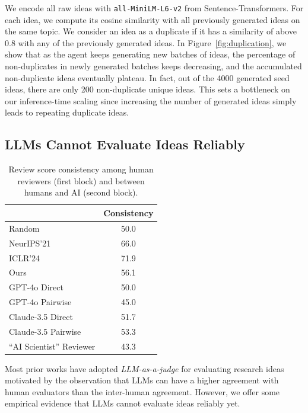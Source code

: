 We encode all raw ideas with \texttt{all-MiniLM-L6-v2} from Sentence-Transformers. For each idea, we compute its cosine similarity with all previously generated ideas on the same topic. 
We consider an idea as a duplicate if it has a similarity of above 0.8 with any of the previously generated ideas. 
In Figure~\ref{fig:duplication}, we show that as the agent keeps generating new batches of ideas, the percentage of non-duplicates in newly generated batches keeps decreasing, and the accumulated non-duplicate ideas eventually plateau. In fact, out of the 4000 generated seed ideas, there are only 200 non-duplicate unique ideas. 
This sets a bottleneck on our inference-time scaling since increasing the number of generated ideas simply leads to repeating duplicate ideas. 


\subsection{LLMs Cannot Evaluate Ideas Reliably}
\label{sec:self_eval}


\begin{table}
\centering
\small 
\begin{tabular}{l c} 
 \hline
 & Consistency \\ 
 \hline
 Random & 50.0 \\
 NeurIPS'21 & 66.0 \\
 ICLR'24 & 71.9 \\ 
 Ours & 56.1 \\
 \hline
 GPT-4o Direct & 50.0 \\ 
 GPT-4o Pairwise & 45.0 \\
 Claude-3.5 Direct & 51.7 \\ 
 Claude-3.5 Pairwise & 53.3 \\ 
 ``AI Scientist'' Reviewer & 43.3 \\
 \hline 
\end{tabular}
\caption{Review score consistency among human reviewers (first block) and between humans and AI (second block).}
\label{table:agreement}
\end{table}

Most prior works have adopted \emph{LLM-as-a-judge} for evaluating research ideas~\cite{AIScientist} motivated by the observation that LLMs can have a higher agreement with human evaluators than the inter-human agreement. However, we offer some empirical evidence that LLMs cannot evaluate ideas reliably yet. 

